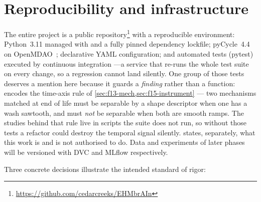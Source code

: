 \section{Reproducibility and infrastructure}
\label{sec:reproducibility}

The entire project is a public
repository\footnote{\url{https://github.com/cedarcreeks/EHMbrAIn}} with a reproducible
environment: Python~3.11 managed with  and a fully pinned dependency lockfile;
pyCycle~4.4 on OpenMDAO~\cite{Gray2019}; declarative YAML configuration; and automated tests
(pytest) executed by continuous integration ---a service that re-runs the whole test suite on
every change, so a regression cannot land silently. One group of those tests deserves a
mention here because it guards a \emph{finding} rather than a function:
 encodes the time-axis rule of
\cref{sec:f13-mech,sec:f15-instrument} --- two mechanisms matched at end of life must be
separable by a shape descriptor when one has a wash sawtooth, and must \emph{not} be separable
when both are smooth ramps. The studies behind that rule live in scripts the suite does not
run, so without those tests a refactor could destroy the temporal signal silently.
 states, separately, what this work is and is not authorised to do. Data and experiments of later phases will
be versioned with DVC and MLflow respectively.

Three concrete decisions illustrate the intended standard of rigor:

